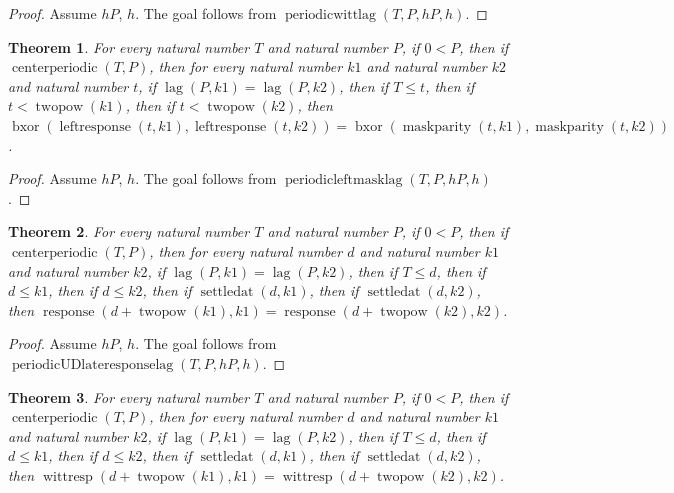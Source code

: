 \documentclass[11pt]{article}
\newtheorem{theorem}{Theorem}[section]
\theoremstyle{definition}
\begin{document}
\begin{proof}
Assume \(hP\), \(h\).
The goal follows from \(\operatorname{periodicwittlag}(T, P, hP, h)\).
\end{proof}
\begin{theorem}
\label{ll:paper:periodic-left-mask-lag}
For every natural number \(T\) and natural number \(P\), if \(0 < P\), then if \(\operatorname{centerperiodic}(T, P)\), then for every natural number \(k1\) and natural number \(k2\) and natural number \(t\), if \(\operatorname{lag}(P, k1) = \operatorname{lag}(P, k2)\), then if \(T \le t\), then if \(t < \operatorname{twopow}(k1)\), then if \(t < \operatorname{twopow}(k2)\), then \(\operatorname{bxor}(\operatorname{leftresponse}(t, k1), \operatorname{leftresponse}(t, k2)) = \operatorname{bxor}(\operatorname{maskparity}(t, k1), \operatorname{maskparity}(t, k2))\).
\end{theorem}
\begin{proof}
Assume \(hP\), \(h\).
The goal follows from \(\operatorname{periodicleftmasklag}(T, P, hP, h)\).
\end{proof}
\begin{theorem}
\label{ll:paper:periodic-late-response-lag}
For every natural number \(T\) and natural number \(P\), if \(0 < P\), then if \(\operatorname{centerperiodic}(T, P)\), then for every natural number \(d\) and natural number \(k1\) and natural number \(k2\), if \(\operatorname{lag}(P, k1) = \operatorname{lag}(P, k2)\), then if \(T \le d\), then if \(d \le k1\), then if \(d \le k2\), then if \(\operatorname{settledat}(d, k1)\), then if \(\operatorname{settledat}(d, k2)\), then \(\operatorname{response}(d + \operatorname{twopow}(k1), k1) = \operatorname{response}(d + \operatorname{twopow}(k2), k2)\).
\end{theorem}
\begin{proof}
Assume \(hP\), \(h\).
The goal follows from \(\operatorname{periodicUDlateresponselag}(T, P, hP, h)\).
\end{proof}
\begin{theorem}
\label{ll:paper:periodic-late-witt-lag}
For every natural number \(T\) and natural number \(P\), if \(0 < P\), then if \(\operatorname{centerperiodic}(T, P)\), then for every natural number \(d\) and natural number \(k1\) and natural number \(k2\), if \(\operatorname{lag}(P, k1) = \operatorname{lag}(P, k2)\), then if \(T \le d\), then if \(d \le k1\), then if \(d \le k2\), then if \(\operatorname{settledat}(d, k1)\), then if \(\operatorname{settledat}(d, k2)\), then \(\operatorname{wittresp}(d + \operatorname{twopow}(k1), k1) = \operatorname{wittresp}(d + \operatorname{twopow}(k2), k2)\).
\end{theorem}
\end{document}
